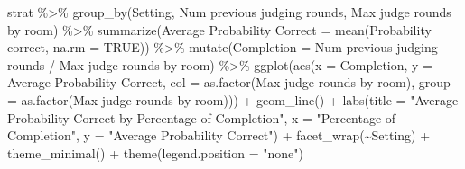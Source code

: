 \documentclass[
]{article}
\newenvironment{Shaded}{\begin{snugshade}}{\end{snugshade}}
\newcommand{\AttributeTok}[1]{\textcolor[rgb]{0.77,0.63,0.00}{#1}}
\newcommand{\ConstantTok}[1]{\textcolor[rgb]{0.00,0.00,0.00}{#1}}
\newcommand{\FunctionTok}[1]{\textcolor[rgb]{0.00,0.00,0.00}{#1}}
\newcommand{\NormalTok}[1]{#1}
\newcommand{\OtherTok}[1]{\textcolor[rgb]{0.56,0.35,0.01}{#1}}
\newcommand{\SpecialCharTok}[1]{\textcolor[rgb]{0.00,0.00,0.00}{#1}}
\newcommand{\StringTok}[1]{\textcolor[rgb]{0.31,0.60,0.02}{#1}}
\begin{document}
\begin{Shaded}
\begin{Highlighting}[]
\NormalTok{strat }\SpecialCharTok{\%\textgreater{}\%}
  \FunctionTok{group\_by}\NormalTok{(Setting, }\StringTok{\textasciigrave{}}\AttributeTok{Num previous judging rounds}\StringTok{\textasciigrave{}}\NormalTok{, }\StringTok{\textasciigrave{}}\AttributeTok{Max judge rounds by room}\StringTok{\textasciigrave{}}\NormalTok{) }\SpecialCharTok{\%\textgreater{}\%}
  \FunctionTok{summarize}\NormalTok{(}\StringTok{\textasciigrave{}}\AttributeTok{Average Probability Correct}\StringTok{\textasciigrave{}} \OtherTok{=} \FunctionTok{mean}\NormalTok{(}\StringTok{\textasciigrave{}}\AttributeTok{Probability correct}\StringTok{\textasciigrave{}}\NormalTok{, }\AttributeTok{na.rm =} \ConstantTok{TRUE}\NormalTok{)) }\SpecialCharTok{\%\textgreater{}\%}
  \FunctionTok{mutate}\NormalTok{(}\AttributeTok{Completion =} \StringTok{\textasciigrave{}}\AttributeTok{Num previous judging rounds}\StringTok{\textasciigrave{}} \SpecialCharTok{/} \StringTok{\textasciigrave{}}\AttributeTok{Max judge rounds by room}\StringTok{\textasciigrave{}}\NormalTok{) }\SpecialCharTok{\%\textgreater{}\%}
  \FunctionTok{ggplot}\NormalTok{(}\FunctionTok{aes}\NormalTok{(}\AttributeTok{x =}\NormalTok{ Completion, }\AttributeTok{y =} \StringTok{\textasciigrave{}}\AttributeTok{Average Probability Correct}\StringTok{\textasciigrave{}}\NormalTok{, }\AttributeTok{col =} \FunctionTok{as.factor}\NormalTok{(}\StringTok{\textasciigrave{}}\AttributeTok{Max judge rounds by room}\StringTok{\textasciigrave{}}\NormalTok{), }\AttributeTok{group =} \FunctionTok{as.factor}\NormalTok{(}\StringTok{\textasciigrave{}}\AttributeTok{Max judge rounds by room}\StringTok{\textasciigrave{}}\NormalTok{))) }\SpecialCharTok{+}
  \FunctionTok{geom\_line}\NormalTok{() }\SpecialCharTok{+}
  \FunctionTok{labs}\NormalTok{(}\AttributeTok{title =} \StringTok{"Average Probability Correct by Percentage of Completion"}\NormalTok{,}
       \AttributeTok{x =} \StringTok{"Percentage of Completion"}\NormalTok{, }
       \AttributeTok{y =} \StringTok{"Average Probability Correct"}\NormalTok{) }\SpecialCharTok{+}
  \FunctionTok{facet\_wrap}\NormalTok{(}\SpecialCharTok{\textasciitilde{}}\NormalTok{Setting) }\SpecialCharTok{+}
  \FunctionTok{theme\_minimal}\NormalTok{() }\SpecialCharTok{+}
  \FunctionTok{theme}\NormalTok{(}\AttributeTok{legend.position =} \StringTok{"none"}\NormalTok{)}
\end{Highlighting}
\end{Shaded}
\end{document}
